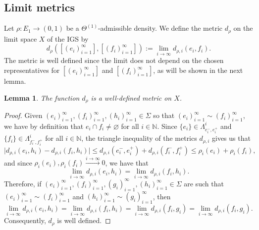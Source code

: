 \documentclass{amsart}
\newtheorem{lemma}[equation]{Lemma}
\numberwithin{equation}{section}
\theoremstyle{definition}
\theoremstyle{remark}
\newcommand{\N}{\mathbb{N}}
\begin{document}
\subsection{Limit metrics}
    Let \(\rho\colon E_1\to (0,1)\) be a \(\Theta^{(1)}\)-admissible density. We define the metric \(d_\rho\) on the limit space \(X\) of the IGS  by
        \[
            d_\rho([(e_i)_{i=1}^\infty],[(f_i)_{i=1}^\infty]):=\lim_{i\to \infty}d_{\rho,i}(e_i,f_i).
        \]
    The metric is well defined since the limit does not depend on the chosen representatives for \([(e_i)_{i=1}^\infty]\) and \([(f_i)_{i=1}^\infty]\), as will be shown in the next lemma.
\begin{lemma}\label{Lemma: Well-definedness of Metric}
    The function \(d_\rho\) is a well-defined metric on \(X\).
\end{lemma}
\begin{proof}
    Given \((e_i)_{i=1}^\infty,(f_i)_{i=1}^\infty,(h_i)_{i=1}^\infty\in \Sigma\) so that \((e_i)_{i=1}^\infty\sim (f_i)_{i=1}^\infty\), we have by definition that \(e_i\cap f_i\neq \varnothing\) for all \(i\in\N\). Since \(\{e_i\}\in \Lambda_{e_i^-,e_i^+}^i\) and \(\{f_i\}\in \Lambda_{f_i^-,f_i^+}^i\) for all \(i\in \N\), the triangle inequality of the metrics \(d_{\rho,i}\) gives us that
        \[
            \lvert d_{\rho,i}(e_i,h_i)-d_{\rho,i}(f_i,h_i)\rvert \leq d_{\rho,i}(e_i^-,e_i^+)+d_{\rho,i}(f_i^-,f_i^+)\leq\rho_i(e_i)+\rho_i(f_i),
        \]
    and since \(\rho_i(e_i),\rho_i(f_i)\stackrel{i\to \infty}{\longrightarrow}0\), we have that 
        \[
            \lim_{i\to \infty}d_{\rho,i}(e_i,h_i)=\lim_{i\to\infty}d_{\rho,i}(f_i,h_i).
        \]
    Therefore, if \((e_i)_{i=1}^\infty,(f_i)_{i=1}^\infty,(g_i)_{i=1}^\infty,(h_i)_{i=1}^\infty\in\Sigma\) are such that \((e_i)_{i=1}^\infty\sim(f_i)_{i=1}^\infty\) and \((h_i)_{i=1}^\infty\sim(g_i)_{i=1}^\infty\), then
        \[
            \lim_{i\to \infty}d_{\rho,i}(e_i,h_i)=\lim_{i\to \infty}d_{\rho,i}(f_i,h_i)=\lim_{i\to \infty}d_{\rho,i}(f_i,g_i)=\lim_{i\to\infty}d_{\rho,i}(f_i,g_i).
        \]
    Consequently, \(d_{\rho}\) is well defined. 
    

\end{proof}
\end{document}
